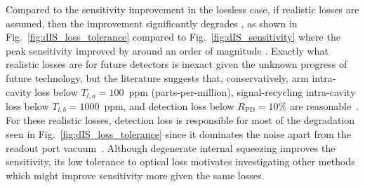 Compared to the sensitivity improvement in the lossless case, if realistic losses are assumed, then the improvement significantly degrades , as shown in Fig.~\ref{fig:dIS_loss_tolerance} compared to Fig.~\ref{fig:dIS_sensitivity} where the peak sensitivity improved by around an order of magnitude . Exactly what realistic losses are for future detectors is inexact given the unknown progress of future technology, but the literature suggests that, conservatively, arm intra-cavity loss below $T_{l,a}=100$~ppm (parts-per-million), signal-recycling intra-cavity loss below $T_{l,b}=1000$~ppm, and detection loss below $R_\text{PD}=10\%$ are reasonable~\cite{zhangBroadbandSignalRecycling2021,}. For these realistic losses, detection loss is responsible for most of the degradation seen in Fig.~\ref{fig:dIS_loss_tolerance} since it dominates the noise apart from the readout port vacuum~\cite{}. %
Although degenerate internal squeezing improves the sensitivity, its low  tolerance to optical loss motivates investigating other methods which might improve sensitivity more given the same losses. 





